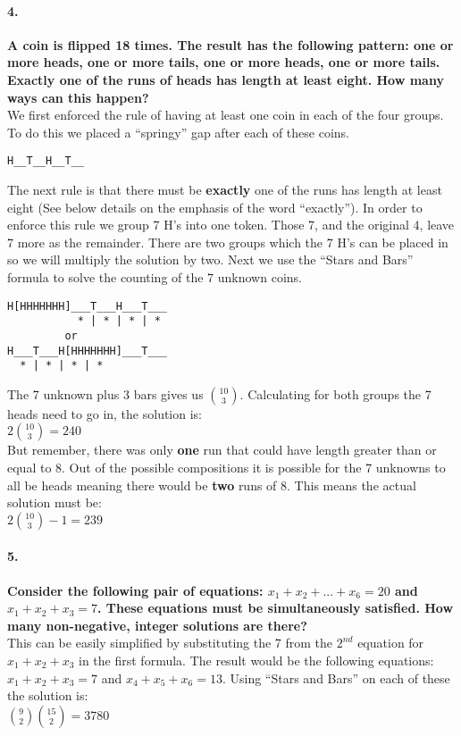 \documentclass{article}
\begin{document}
\paragraph{4. }
\textbf{A coin is flipped 18 times. The result has the following pattern: one or 
more heads, one or more tails, one or more heads, one or more tails. Exactly one 
of the runs of heads has length at least eight. How many ways can this happen?}\\
We first enforced the rule of having at least one coin in each of the four 
groups. To do this we placed a ``springy'' gap after each of these coins.
\begin{verbatim}
H__T__H__T__
\end{verbatim}
The next rule is that there must be \textbf{exactly} one of the runs has length 
at least eight (See below details on the emphasis of the word ``exactly'').
In order to enforce this rule we group 7 H's into one token. Those 7, and the 
original 4, leave 7 more as the remainder. There are two groups which the 7 H's 
can be placed in so we will multiply the solution by two. Next we use the 
``Stars and Bars'' formula to solve the counting of the 7 unknown coins.
\begin{verbatim}
H[HHHHHHH]___T___H___T___
           * | * | * | *
         or
H___T___H[HHHHHHH]___T___
  * | * | * | *
\end{verbatim}
The 7 unknown plus 3 bars gives us ${10 \choose 3}$. Calculating for both groups 
the 7 heads need to go in, the solution is:\\
$2{10 \choose 3} = 240$\\
But remember, there was only \textbf{one} run that could have length greater 
than or equal to 8. Out of the possible compositions it is possible for the 7 
unknowns to all be heads meaning there would be \textbf{two} runs of 8. This 
means the actual solution must be:\\
$\boxed{2{10 \choose 3} - 1 = 239}$

\paragraph{5. }
\textbf{Consider the following pair of equations: $x_1 + x_2 + . . . + x_6 = 20$ 
and $x_1 + x_2 + x_3 = 7$. These equations must be simultaneously satisfied. How 
many non-negative, integer solutions are there?}\\
This can be easily simplified by substituting the 7 from the $2^{nd}$ equation 
for $x_1+x_2+x_3$ in the first formula. The result would be the following 
equations:\\
$x_1+x_2+x_3 = 7$ and $x_4+x_5+x_6 = 13$.
Using ``Stars and Bars'' on each of these the solution is:\\
 $\boxed{{9 \choose 2}{15 \choose 2} = 3780}$
\end{document}
